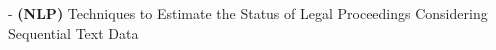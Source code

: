 - \textbf{(NLP)} Techniques to Estimate the Status of Legal Proceedings Considering Sequential Text Data \\
